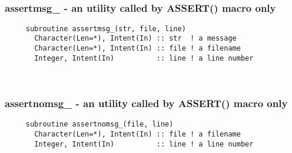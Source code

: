  
\mbox{}\hrulefill\ 
 
  \subsubsection{assertmsg\_ - an utility called by ASSERT() macro only}

\begin{verbatim} 
     subroutine assertmsg_(str, file, line)
       Character(Len=*), Intent(In) :: str	! a message
       Character(Len=*), Intent(In) :: file	! a filename
       Integer, Intent(In)          :: line	! a line number
 \end{verbatim}%
 
 
\mbox{}\hrulefill\ 
 
  \subsubsection{assertnomsg\_ - an utility called by ASSERT() macro only}

\begin{verbatim} 
     subroutine assertnomsg_(file, line)
       Character(Len=*), Intent(In) :: file	! a filename
       Integer, Intent(In)          :: line	! a line number
 \end{verbatim}%

 
 
\mbox{}\hrulefill\ 


